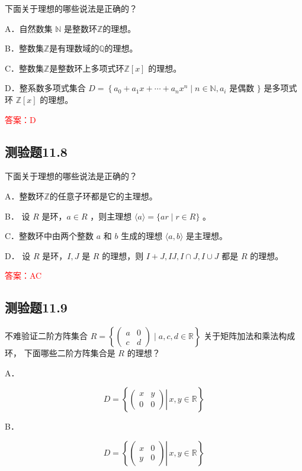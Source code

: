 \documentclass[UTF8, heading=true]{ctexart}
\begin{document}
下面关于理想的哪些说法是正确的？

A．自然数集 $\mathbb{N}$ 是整数环$\mathbb{Z}$的理想。

B．整数集$\mathbb{Z}$是有理数域的$\mathbb{Q}$的理想。

C．整数集$\mathbb{Z}$是整数环上多项式环$\mathbb{Z}[x]$ 的理想。

D．整系数多项式集合 $D=\left\{a_0+a_1 x+\cdots+a_n x^n \mid n \in \mathbb{N}, a_i\right.$ 是偶数 $\}$ 是多项式环 $\mathbb{Z}[x]$ 的理想。


\textcolor{red}{答案：D}


\subsection{测验题11.8}

下面关于理想的哪些说法是正确的？

A．整数环$\mathbb{Z}$的任意子环都是它的主理想。

B．
设 $R$ 是环，$a \in R$ ，则主理想 $\langle a\rangle=\{a r \mid r \in R\}$ 。

C．整数环中由两个整数 $a$ 和 $b$ 生成的理想 $\langle a, b\rangle$ 是主理想。

D．
设 $R$ 是环，$I, J$ 是 $R$ 的理想，则 $I+J, I J, I \cap J, I \cup J$ 都是 $R$ 的理想。

\textcolor{red}{答案：AC}

\subsection{测验题11.9}

不难验证二阶方阵集合 $R=
\left\{\left(\begin{array}{ll}a & 0 \\ c & d\end{array}\right)
\mid a, c, d \in \mathbb{R}\right\}$
关于矩阵加法和乘法构成环，
下面哪些二阶方阵集合是 $R$ 的理想？

A．

$$
D=\left\{\left.\left(\begin{array}{ll}
x & y \\
0 & 0
\end{array}\right) \right\rvert\, x, y \in \mathbb{R}\right\}
$$


B．

$$
D=\left\{\left.\left(\begin{array}{ll}
x & 0 \\
y & 0
\end{array}\right) \right\rvert\, x, y \in \mathbb{R}\right\}
$$
\end{document}
